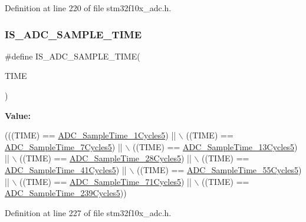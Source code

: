 Definition at line 220 of file stm32f10x\+\_\+adc.\+h.

\mbox{\label{group___a_d_c__sampling__time_ga30e0307fa009e1c383d3047b48e94644}} 
\subsubsection{\texorpdfstring{I\+S\+\_\+\+A\+D\+C\+\_\+\+S\+A\+M\+P\+L\+E\+\_\+\+T\+I\+ME}{IS\_ADC\_SAMPLE\_TIME}}
{\footnotesize\ttfamily \#define I\+S\+\_\+\+A\+D\+C\+\_\+\+S\+A\+M\+P\+L\+E\+\_\+\+T\+I\+ME(\begin{DoxyParamCaption}\item[{}]{T\+I\+ME }\end{DoxyParamCaption})}

{\bfseries Value\+:}
\begin{DoxyCode}
(((TIME) == \hyperlink{group___a_d_c__sampling__time_gad085065e48857ada890863a7db575c6e}{ADC\_SampleTime\_1Cycles5}) || \(\backslash\)
                                  ((TIME) == \hyperlink{group___a_d_c__sampling__time_gac4101073619c4d79efa28a477696b3f5}{ADC\_SampleTime\_7Cycles5}) || \(\backslash\)
                                  ((TIME) == \hyperlink{group___a_d_c__sampling__time_gaef37e223e826ac5e6ee5ef30881f9b27}{ADC\_SampleTime\_13Cycles5}) || \(\backslash\)
                                  ((TIME) == \hyperlink{group___a_d_c__sampling__time_ga6251e64783f7a6562e17e71f7edd68d8}{ADC\_SampleTime\_28Cycles5}) || \(\backslash\)
                                  ((TIME) == \hyperlink{group___a_d_c__sampling__time_gadc3d26f9bf5fa6589889cc938c66e0e7}{ADC\_SampleTime\_41Cycles5}) || \(\backslash\)
                                  ((TIME) == \hyperlink{group___a_d_c__sampling__time_ga6a6fbbadc0e35a719fb749bf6b0704d6}{ADC\_SampleTime\_55Cycles5}) || \(\backslash\)
                                  ((TIME) == \hyperlink{group___a_d_c__sampling__time_gae46e8978ac3160969156739ddb867dae}{ADC\_SampleTime\_71Cycles5}) || \(\backslash\)
                                  ((TIME) == \hyperlink{group___a_d_c__sampling__time_ga93117dc4090dc4e3e84e0eef6d6ab073}{ADC\_SampleTime\_239Cycles5}))
\end{DoxyCode}


Definition at line 227 of file stm32f10x\+\_\+adc.\+h.

